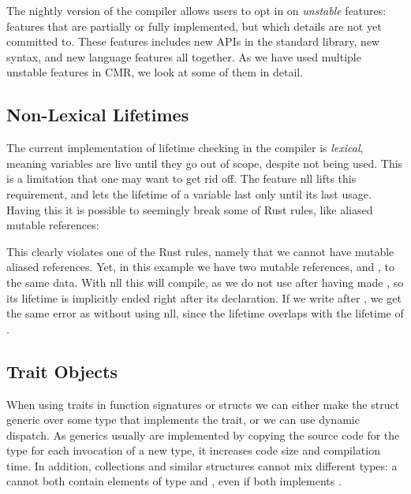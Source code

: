 The nightly version of the compiler allows users to opt in on \emph{unstable} features: features
that are partially or fully implemented, but which details are not yet committed to. These features
includes new APIs in the standard library, new syntax, and new language features all together.
As we have used multiple unstable features in CMR, we look at some of them in detail.


\subsection{Non-Lexical Lifetimes\label{sec:nll}}
The current implementation of lifetime checking in the compiler is \emph{lexical}, meaning
variables are live until they go out of scope, despite not being used. This is a limitation that
one may want to get rid off. The feature \gls{nll} lifts this requirement, and lets the lifetime of
a variable last only until its last usage. Having this it is possible to seemingly break some of
Rust rules, like aliased mutable references:

This clearly violates one of the Rust rules, namely that we cannot have mutable aliased references.
Yet, in this example we have two mutable references,  and , to the same data.
With \gls{nll} this will compile, as we do not use  after having made , so its
lifetime is implicitly ended right after its declaration. If we write  after
, we get the same error as without using \gls{nll}, since the lifetime 
overlaps with the lifetime of .



\subsection{Trait Objects\label{sec:trait-objects}}

When using traits in function signatures or structs we can either make the struct generic over some
type that implements the trait, or we can use dynamic dispatch. As generics usually are implemented
by copying the source code for the type for each invocation of a new type, it increases code size
and compilation time. In addition, collections and similar structures cannot mix different types: a
 cannot both contain elements of type  and , even if both
implements .

